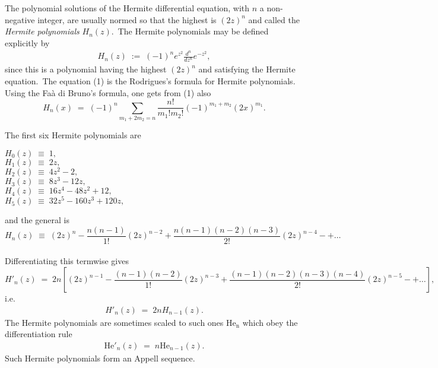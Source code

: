 \documentclass[12pt]{article}
\theoremstyle{definition}
\begin{document}
The polynomial solutions of the Hermite differential equation, with $n$ a non-negative integer, are usually normed so that the highest   is $(2z)^n$ and called the {\em Hermite polynomials} $H_n(z)$.\, The Hermite polynomials may be defined explicitly by
\begin{align}
H_n(z) \;:=\; (-1)^ne^{z^2}\frac{d^n}{dz^n}e^{-z^2},
\end{align}
since this is a polynomial having the highest  $(2z)^n$ and satisfying the Hermite equation.\, The equation (1) is the Rodrigues's formula for Hermite polynomials.\, Using the Fa\`a di Bruno's formula, one gets from (1) also
$$H_n(x) \;=\; (-1)^n\!\sum_{m_1+2m_2=n}\frac{n!}{m_1!m_2!}(-1)^{m_1+m_2}(2x)^{m_1}.$$ 

The first six Hermite polynomials are

$H_0(z) \;\equiv\; 1,$\\
$H_1(z) \;\equiv\; 2z,$\\
$H_2(z) \;\equiv\; 4z^2\!-\!2,$\\
$H_3(z) \;\equiv\; 8z^3\!-\!12z,$\\
$H_4(z) \;\equiv\; 16z^4\!-\!48z^2\!+\!12,$\\
$H_5(z) \;\equiv\; 32z^5\!-\!160z^3\!+\!120z,$

and the general  is
$$H_n(z) \;\equiv\; (2z)^n-\frac{n(n\!-\!1)}{1!}(2z)^{n-2}
+\frac{n(n\!-\!1)(n\!-\!2)(n\!-\!3)}{2!}(2z)^{n-4}-+\ldots$$\\

Differentiating this termwise gives
$$H'_n(z) \;=\; 2n\!\left[(2z)^{n-1}-\frac{(n\!-\!1)(n\!-\!2)}{1!}(2z)^{n-3}+
\frac{(n\!-\!1)(n\!-\!2)(n\!-\!3)(n\!-\!4)}{2!}(2z)^{n-5}-+\ldots\right]\!,$$
i.e.
\begin{align}
H'_n(z) \;=\; 2nH_{n-1}(z).
\end{align}
The Hermite polynomials are sometimes scaled to such ones $\mathrm{He_n}$ which obey the differentiation rule
\begin{align}
\mathrm{He}'_n(z) \;=\; n\mathrm{He}_{n-1}(z).
\end{align}
Such Hermite polynomials form an Appell sequence.
\end{document}
